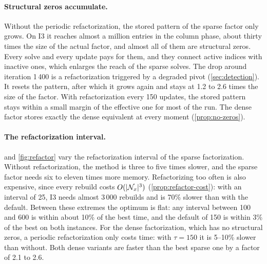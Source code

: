 \paragraph{Structural zeros accumulate.} Without the periodic refactorization, the stored
pattern of the sparse factor only grows. On I3 it reaches almost a million entries in the
column phase, about thirty times the size of the actual factor, and almost all of them are
structural zeros. Every solve and every update pays for them, and they connect active indices
with inactive ones, which enlarges the reach of the sparse solves. The drop around iteration
1\,400 is a refactorization triggered by a degraded pivot (\cref{sec:detection}). It resets the
pattern, after which it grows again and stays at 1.2 to 2.6 times the size of the factor. With
refactorization every 150 updates, the stored pattern stays within a small margin of the
effective one for most of the run. The dense factor stores exactly the dense equivalent at
every moment (\cref{prop:no-zeros}).

\paragraph{The refactorization interval.}  and \cref{fig:refactor} vary the
refactorization interval of the sparse factorization. Without refactorization, the method is
three to five times slower, and the sparse factor needs six to eleven times more memory.
Refactorizing too often is also expensive, since every rebuild costs $O(|\mathcal{N}_x|^3)$
(\cref{prop:refactor-cost}): with an interval of 25, I3 needs almost 3\,000 rebuilds and is
70\% slower than with the default. Between these extremes the optimum is flat: any interval
between 100 and 600 is within about 10\% of the best time, and the default of 150 is within
3\% of the best on both instances. For the dense factorization, which has no structural zeros,
a periodic refactorization only costs time: with $\tau = 150$ it is 5--10\% slower than without.
Both dense variants are faster than the best sparse one by a factor of 2.1 to 2.6.

\begin{table}[ht]
\centering
\small
\renewcommand{\arraystretch}{1.15}
\caption{Effect of the refactorization interval (equality variants). ``max.\ zeros'' is the
largest number of stored entries that are zero; for the dense factor these are entries of
$L$ that happen to vanish, not structural zeros. ``reach$/|\Nx|$'' is the average number of
rows touched by a solve per nullspace column. ``never'' still refactorizes when a pivot
degrades. These runs form a separate series (times are the faster of two runs), so the times
differ slightly from \cref{tab:comparison-eq}.}
\label{tab:refactor}
\end{table}

